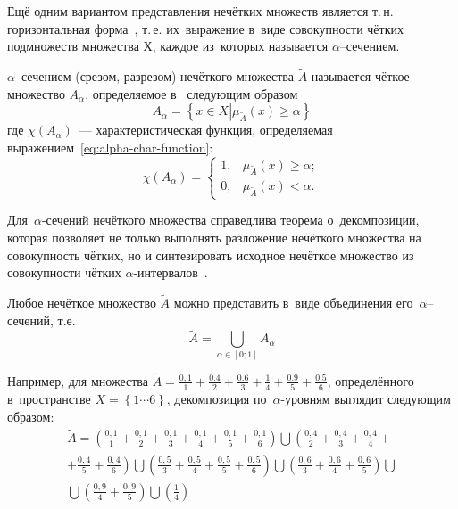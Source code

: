 Ещё одним вариантом представления нечётких множеств является т.\,н. горизонтальная форма~\cite{Pegat}, т.\,е. их~выражение в~виде совокупности чётких подмножеств множества Х, каждое из~которых называется $\alpha$--сечением. 
\begin{mydef} 
$\alpha$--сечением (срезом, разрезом) нечёткого множества $\tilde{A}$ называется чёткое множество $A_\alpha$, определяемое в~\cite{Rutkovskaya, Pospelov, Borisov_Alexeev_Msk} следующим образом 
\begin{equation}
\label{eq:alpha-cut}
	A_{\alpha}= \left\{ x\in X \left| \mu_{\tilde A}\left( x \right)\geqslant \alpha \right. \right\}
\end{equation}
где $\chi \left( {{A}_{\alpha }} \right)$~--- характеристическая функция, определяемая выражением~\eqref{eq:alpha-char-function}:
\begin{equation}
\label{eq:alpha-char-function}
	\chi \left( {{A}_{\alpha }} \right)=\left\{
		\begin{aligned}
			1, & \mu_{\tilde A}\left( x \right) \geqslant \alpha; \\
			0, & \mu_{\tilde A}\left( x \right) < \alpha.
		\end{aligned}		 
	\right.
\end{equation}
\end{mydef}

Для~$\alpha$-сечений нечёткого множества справедлива теорема о~декомпозиции, которая позволяет не только выполнять разложение нечёткого множества на совокупность чётких, но и синтезировать исходное нечёткое множество из совокупности чётких $\alpha$-интервалов~\cite{Kaufmann}. 
\begin{theorem}
Любое нечёткое множество $\tilde{A}$ можно представить в~виде объединения его~$\alpha$--сечений, т.е.
\begin{equation}
\label{eq:alpha-cut-theorem}
	\tilde{A}=\bigcup\limits_{\alpha \in \left[ 0;1 \right]}{A_\alpha}
\end{equation}
\end{theorem}

Например, для множества $\displaystyle \tilde{A}=\frac{0,1}{1}+\frac{0.4}{2}+\frac{0.6}{3}+\frac{1}{4}+\frac{0.9}{5}+\frac{0.5}{6}$, определённого в~пространстве $\displaystyle X=\left\{ 1 \cdots 6 \right\}$, декомпозиция по~$\alpha$-уровням выглядит следующим образом:
\begin{gather*}
	  \tilde{A}=\left( \frac{0,1}{1}+\frac{0,1}{2}+\frac{0,1}{3}+\frac{0,1}{4}+\frac{0,1}{5}+\frac{0,1}{6} \right)\bigcup \left( \frac{0,4}{2}+\frac{0,4}{3}+\frac{0,4}{4}+\right.\\
	  \left. +\frac{0,4}{5}+\frac{0,4}{6} \right) \bigcup\left( \frac{0,5}{3}+\frac{0,5}{4}+\frac{0,5}{5}+\frac{0,5}{6} \right) \bigcup \left( \frac{0,6}{3}+\frac{0,6}{4}+\frac{0,6}{5} \right) \bigcup {} \\
	  {} \bigcup \left( \frac{0,9}{4}+\frac{0,9}{5} \right) \bigcup \left( \frac{1}{4} \right) 
\end{gather*}

